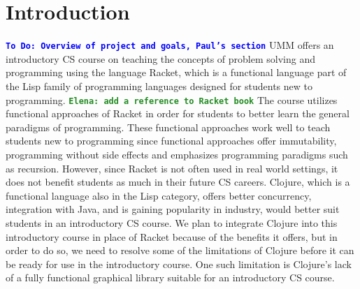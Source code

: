 \documentclass[12pt]{article}
\newcommand{\comment}[1]{{\bf \tt  {#1}}}
\newcommand{\emcomment}[1]{\textcolor{ForestGreen}{\comment{Elena: {#1}}}}
\newcommand{\todo}[1]{\textcolor{blue}{\comment{To Do: {#1}}}}
\begin{document}
\section{Introduction}\label{sec:intro}
\todo{Overview of project and goals, Paul's section}
UMM offers an introductory CS course on teaching the concepts of problem solving and programming using the language Racket, which is a functional language part of the Lisp family of programming languages designed for students new to programming.
\emcomment{add a reference to Racket book} The course utilizes functional approaches of Racket in order for students to better learn the general paradigms of programming. These functional approaches work well to teach students new to programming since functional approaches offer immutability, programming without side effects and emphasizes programming paradigms such as recursion. However, since Racket is not often used in real world settings, it does not benefit students as much in their future CS careers. Clojure, which is a functional language also in the Lisp category, offers better concurrency, integration with Java, and is gaining popularity in industry, would better suit students in an introductory CS course.  We plan to integrate Clojure into this introductory course in place of Racket because of the benefits it offers, but in order to do so, we need to resolve some of the limitations of Clojure before it can be ready for use in the introductory course. One such limitation is Clojure's lack of a fully functional graphical library suitable for an introductory CS course. 
\end{document}
